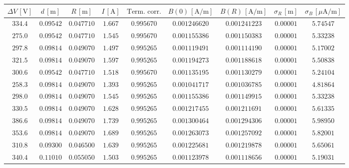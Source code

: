 \documentclass[]{article}
\begin{document}
    \begin{table}[H]
        \centering

    \begin{tabular}{||c|c|c|c|c|c|c|c|c||}
        \hline
        $\Delta V\, [\text{V}] $ & $d\, [\text{m}] $ & $R\, [\text{m}] $ & $I\, [\text{A}] $ & $\text{Term. corr.}$ & $B(0)\, [\text{A/m}] $ & $B(R)\, [\text{A/m}] $ & $ \sigma_R \, [\text{m}] $ & $ \sigma_B \, [\mu\text{A/m}] $ \\
        \hline\hline


 
        $334.4$ & $0.09542$ & $0.047710$ & $1.667$ & $0.995670$ & $0.001246620$ & $0.001241223$ & $0.00001$ & $5.74547$ \\\hline
        $275.0$ & $0.09542$ & $0.047710$ & $1.545$ & $0.995670$ & $0.001155386$ & $0.001150383$ & $0.00001$ & $5.33238$ \\\hline
        $297.8$ & $0.09814$ & $0.049070$ & $1.497$ & $0.995265$ & $0.001119491$ & $0.001114190$ & $0.00001$ & $5.17002$ \\\hline
        $321.5$ & $0.09814$ & $0.049070$ & $1.597$ & $0.995265$ & $0.001194273$ & $0.001188618$ & $0.00001$ & $5.50838$ \\\hline
        $300.6$ & $0.09542$ & $0.047710$ & $1.518$ & $0.995670$ & $0.001135195$ & $0.001130279$ & $0.00001$ & $5.24104$ \\\hline
        $258.3$ & $0.09814$ & $0.049070$ & $1.393$ & $0.995265$ & $0.001041717$ & $0.001036785$ & $0.00001$ & $4.81864$ \\\hline
        $298.0$ & $0.09814$ & $0.049070$ & $1.545$ & $0.995265$ & $0.001155386$ & $0.001149915$ & $0.00001$ & $5.33238$ \\\hline
        $330.5$ & $0.09814$ & $0.049070$ & $1.628$ & $0.995265$ & $0.001217455$ & $0.001211691$ & $0.00001$ & $5.61335$ \\\hline
        $386.6$ & $0.09814$ & $0.049070$ & $1.739$ & $0.995265$ & $0.001300464$ & $0.001294306$ & $0.00001$ & $5.98950$ \\\hline
        $353.6$ & $0.09814$ & $0.049070$ & $1.689$ & $0.995265$ & $0.001263073$ & $0.001257092$ & $0.00001$ & $5.82001$ \\\hline
        $310.8$ & $0.09300$ & $0.046500$ & $1.639$ & $0.995265$ & $0.001225681$ & $0.001219878$ & $0.00001$ & $5.65061$ \\\hline
        $340.4$ & $0.11010$ & $0.055050$ & $1.503$ & $0.995265$ & $0.001123978$ & $0.001118656$ & $0.00001$ & $5.19031$ \\\hline

\end{tabular}
\end{table}
\end{document}
